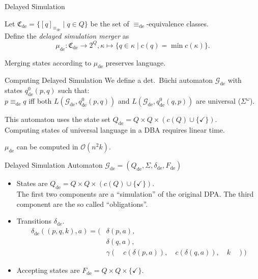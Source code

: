 \begin{frame}{Delayed Simulation}
\begin{defn}
	Let $\mathfrak{C}_\text{de} = \{ [q]_{\equiv_\text{de}} \mid q \in Q \}$ be the set of $\equiv_\text{de}$-equivalence classes. \\
	Define the \emph{delayed simulation merger} as $$\mu_\text{de} : \mathfrak{C}_\text{de} \rightarrow 2^Q, \kappa \mapsto \{ q \in \kappa \mid c(q) = \min c(\kappa) \}.$$
\end{defn}

\begin{theorem}
	Merging states according to $\mu_\text{de}$ preserves language.
\end{theorem}
\end{frame}


\begin{frame}{Computing Delayed Simulation}
	We define a det.\ Büchi automaton $\mathcal{G}_\text{de}$ with states $q_\text{de}^0(p, q)$ such that: \\
	$p \equiv_\text{de} q$ iff both $L(\mathcal{G}_\text{de}, q_\text{de}^0(p, q))$ and $L(\mathcal{G}_\text{de}, q_\text{de}^0(q, p))$ are universal ($\Sigma^\omega$).
	
	\vspace{.5cm}
	
	This automaton uses the state set $Q_\text{de} = Q \times Q \times (c(Q) \cup \{\checkmark\})$. \\
	Computing states of universal language in a DBA requires linear time.
	
	\vspace{.5cm}
	
	\begin{theorem}
		$\mu_\text{de}$ can be computed in $\mathcal{O}(n^2 k)$.
	\end{theorem}
\end{frame}

\begin{frame}{Delayed Simulation Automaton}
$\mathcal{G}_\text{de} = (Q_\text{de}, \Sigma, \delta_\text{de}, F_\text{de})$

\begin{itemize}
	\item States are $Q_\text{de} = Q \times Q \times (c(Q) \cup \{\checkmark\})$. \\
The first two components are a \enquote{simulation} of the original DPA. The third component are the so called \enquote{obligations}.
	\item Transitions $\delta_\text{de}$.
\begin{align*}
	\delta_\text{de}((p, q, k), a) = (& \delta(p, a), \\
									& \delta(q, a), \\
									& \gamma( \quad c(\delta(p, a)), \quad c(\delta(q, a)), \quad k \quad ))
\end{align*}
	\item Accepting states are $F_\text{de} = Q \times Q \times \{\checkmark\}$.
\end{itemize}

\end{frame}


